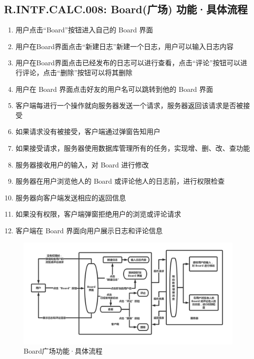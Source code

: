     \subsection{R.INTF.CALC.008: Board(广场) 功能·具体流程}
    \begin{enumerate}
        \item 用户点击“Board”按钮进入自己的 Board 界面
        \item 用户在Board界面点击“新建日志”新建一个日志，用户可以输入日志内容
        \item 用户在Board界面点击已经发布的日志可以进行查看，点击“评论”按钮可以进行评论，点击“删除”按钮可以将其删除
        \item 用户在 Board 界面点击好友的用户名可以跳转到他的 Board 界面
        \item 客户端每进行一个操作就向服务器发送一个请求，服务器返回该请求是否被接受
        \item 如果请求没有被接受，客户端通过弹窗告知用户
        \item 如果接受请求，服务器使用数据库管理所有的任务，实现增、删、改、查功能
        \item 服务器接收用户的输入，对 Board 进行修改
        \item 服务器在用户浏览他人的 Board 或评论他人的日志前，进行权限检查
        \item 服务器向客户端发送相应的返回信息
        \item 如果没有权限，客户端弹窗拒绝用户的浏览或评论请求
        \item 客户端在 Board 界面向用户展示日志和评论信息
    \end{enumerate}
    \begin{figure}[h]
            \centering
            \includegraphics[scale=0.4]{OutlineDesign/figures/Board广场功能·具体流程.png}
            \caption{ Board广场功能·具体流程}
            \label{fig:server_flow}
        \end{figure}
